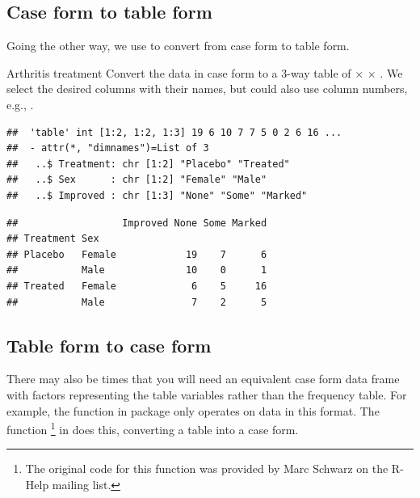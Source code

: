 \documentclass[11pt]{book}
\renewenvironment{knitrout}{\small\renewcommand{\baselinestretch}{.85}}{} %
\begin{document}
\subsection{Case form to table form}
Going the other way, we use  to convert from case form to table form.

\begin{Example}{Arthritis treatment}
Convert the  data in case form to a 3-way table of
 $\times$  $\times$ .
We select the desired columns with their names, but could also use column
numbers, e.g., .
\begin{knitrout}
\color{fgcolor}\begin{kframe}
\begin{alltt}
 \hlkwb{<-} \hlstd{(Arthritis[,}\hlstd{(}\hlstd{,} \hlstd{,} \hlstd{)])}
\end{alltt}
\begin{verbatim}
##  'table' int [1:2, 1:2, 1:3] 19 6 10 7 7 5 0 2 6 16 ...
##  - attr(*, "dimnames")=List of 3
##   ..$ Treatment: chr [1:2] "Placebo" "Treated"
##   ..$ Sex      : chr [1:2] "Female" "Male"
##   ..$ Improved : chr [1:3] "None" "Some" "Marked"
\end{verbatim}
\begin{alltt}
\end{alltt}
\begin{verbatim}
##                  Improved None Some Marked
## Treatment Sex                             
## Placebo   Female            19    7      6
##           Male              10    0      1
## Treated   Female             6    5     16
##           Male               7    2      5
\end{verbatim}
\end{kframe}
\end{knitrout}
\end{Example}

\subsection{Table form to case form}
There may also be times that you will need an equivalent case form data frame
with factors  representing the table variables
rather than the frequency  table.
For example, the  function in package 
only operates on data in this format. 
The function %
\footnote{
The original code for this function was provided by Marc Schwarz on the R-Help
mailing list.
}
in 
does this, converting a table into a case form.
\end{document}
